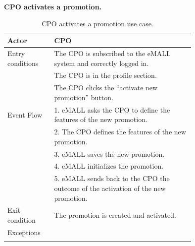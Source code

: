 \textbf{CPO activates a promotion.}
\begin{center}
    \begin{longtable}{lp{0.75\linewidth}}
        \hline
        Actor            & CPO                                                                                \\
        \hline
        Entry conditions & The CPO is subscribed to the eMALL system and correctly logged in.                 \\
        & The CPO is in the profile section.                                                 \\
        & The CPO clicks the “activate new promotion” button.                                \\
        \hline
        Event Flow       & 1. eMALL asks the CPO to define the features of the new promotion.                 \\
        & 2. The CPO defines the features of the new promotion.                              \\
        & 3. eMALL saves the new promotion.                                                  \\
        & 4. eMALL initializes the promotion.                                                \\
        & 5. eMALL sends back to the CPO the outcome of the activation of the new promotion. \\
        \hline
        Exit condition   & The promotion is created and activated.                                            \\
        \hline
        Exceptions       &                                                                                    \\
        \hline
        \caption{CPO activates a promotion use case.}
        \label{tab: CPO_activates_promotion_use_case}
    \end{longtable}
\end{center}

